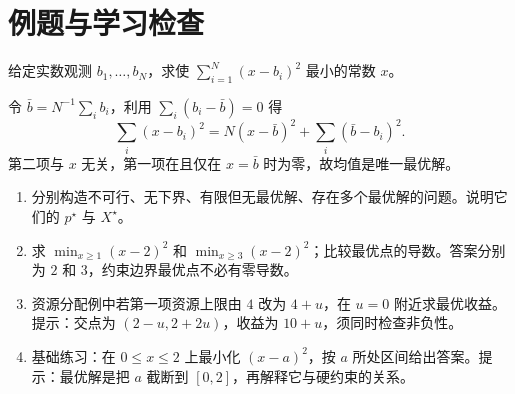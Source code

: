 \section{例题与学习检查}
\begin{example}[均值作为最小二乘解]
给定实数观测 $b_1,\ldots,b_N$，求使 $\sum_{i=1}^N(x-b_i)^2$ 最小的常数 $x$。
\end{example}
\begin{solve}
令 $\bar b=N^{-1}\sum_i b_i$，利用 $\sum_i(b_i-\bar b)=0$ 得
\[
 \sum_i(x-b_i)^2=N(x-\bar b)^2+\sum_i(\bar b-b_i)^2.
\]
第二项与 $x$ 无关，第一项在且仅在 $x=\bar b$ 时为零，故均值是唯一最优解。
\end{solve}
\begin{enumerate}
 \item 分别构造不可行、无下界、有限但无最优解、存在多个最优解的问题。说明它们的 $p^\star$ 与 $X^\star$。
 \item 求 $\min_{x\geq1}(x-2)^2$ 和 $\min_{x\geq3}(x-2)^2$；比较最优点的导数。答案分别为 $2$ 和 $3$，约束边界最优点不必有零导数。
 \item 资源分配例中若第一项资源上限由 $4$ 改为 $4+u$，在 $u=0$ 附近求最优收益。提示：交点为 $(2-u,2+2u)$，收益为 $10+u$，须同时检查非负性。
 \item 基础练习：在 $0\leq x\leq2$ 上最小化 $(x-a)^2$，按 $a$ 所处区间给出答案。提示：最优解是把 $a$ 截断到 $[0,2]$，再解释它与硬约束的关系。
\end{enumerate}

